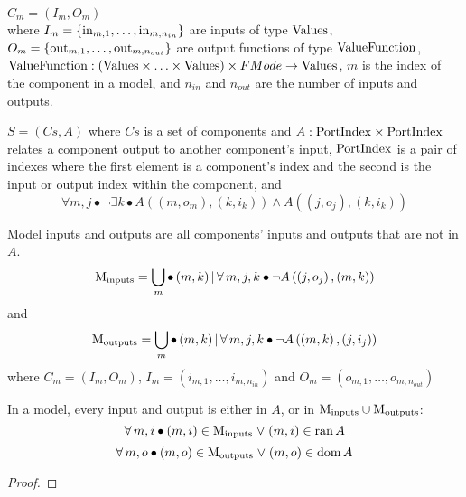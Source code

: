 \begin{definition}[Component]
\begin{sloppypar}
$C_m = \left(I_m, O_m \right)$
%
\\where $I_m = \left\{\mathrm{in}_{m,1},\ldots,\mathrm{in}_{m,n_{in}}\right\}$ are inputs of type $\mathrm{Values}$, $O_m = \left\{ \mathrm{out}_{m,1},\ldots,\mathrm{out}_{m,n_{out}} \right\}$ are output functions of type $\mathrm{ValueFunction}$, $\mathrm{ValueFunction} : (\mathrm{Values} \times \ldots \times \mathrm{Values}) \times FMode \rightarrow \mathrm{Values} $, $m$ is the index of the component in a model, and $n_{in}$ and $n_{out}$ are the number of inputs and outputs.
\end{sloppypar}
\end{definition}

\begin{definition}
$S = \left(Cs, A\right)$
\noindent where $Cs$ is a set of components and $A : \mathrm{PortIndex} \times \mathrm{PortIndex}$ relates a component output to another component's input, $\mathrm{PortIndex}$ is a pair of indexes where the first element is a component's index and the second is the input or output index within the component, and
\[\forall m, j \bullet \lnot \exists k \bullet A\left(\left(m, o_m\right), \left(k, i_k\right)\right) \land A\left(\left(j, o_j\right), \left(k, i_k\right)\right)\]
\end{definition}

\begin{definition}
\label{def:model-in-out}
Model inputs and outputs are all components' inputs and outputs that are not in $A$.
\[
\MIn = \bigcup_m \bullet \left(m,k\right) | \forall m,j,k \bullet \lnot A\left( \left(j, o_j\right), \left(m, k\right) \right)
\]
and
\[
\MOut = \bigcup_m \bullet \left(m,k\right) | \forall m,j,k \bullet \lnot A\left( \left(m, k\right), \left(j, i_j\right) \right)
\]
%
where $C_m = \left(I_m, O_m\right)$, $I_m = \left(i_{m,1},\ldots,i_{m,n_{in}}\right)$ and $O_m = \left(o_{m,1},\ldots,o_{m,n_{out}}\right)$
\end{definition}

\begin{lemma}
In a model, every input and output is either in $A$, or in $\mathrm{M_{inputs}} \cup \mathrm{M_{outputs}}$:
\[\forall m,i \bullet \left(m,i\right) \in \MIn \lor \left(m,i\right) \in \ran A \]
\[\forall m,o \bullet \left(m,o\right) \in \MOut \lor \left(m,o\right) \in \dom A \]
\end{lemma}
\begin{proof}
\end{proof}

